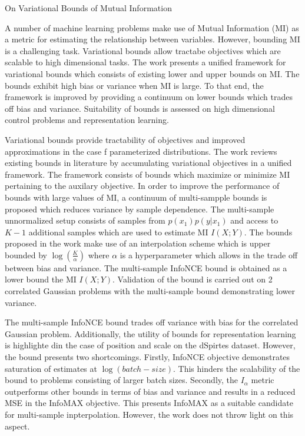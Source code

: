 \documentclass[11pt,letterpaper]{article}
\begin{document}
\begin{center}
  \large{On Variational Bounds of Mutual Information}
\end{center}



A number of machine learning problems make use of Mutual Information (MI) as a metric for estimating the relationship between variables. However, bounding MI is a challenging task. Variational bounds allow tractabe objectives which are scalable to high dimensional tasks. The work presents a unified framework for variational bounds which consists of existing lower and upper bounds on MI. The bounds exhibit high bias or variance when MI is large. To that end, the framework is improved by providing a continuum on lower bounds which trades off bias and variance. Suitability of bounds is assessed on high dimensional control problems and representation learning. 

Variational bounds provide tractability of objectives and improved approximations in the case f parameterized distributions. The work reviews existing bounds in literature by accumulating variational objectives in a unified framework. The framework consists of bounds which maximize or minimize MI pertaining to the auxilary objective. In order to improve the performance of bounds with large values of MI, a continuum of multi-sampple bounds is proposed which reduces variance by sample dependence. The multi-sample unnormalized setup consists of samples from $p(x_{1})p(y|x_{1})$ and access to $K-1$ additional samples which are used to estimate MI $I(X;Y)$. The bounds proposed in the work make use of an interpolation scheme which is upper bounded by $\log(\frac{K}{\alpha})$ where $\alpha$ is a hyperparameter which allows in the trade off between bias and variance. The multi-sample InfoNCE bound is obtained as a lower bound the MI $I(X;Y)$. Validation of the bound is carried out on 2 correlated Gaussian problems with the multi-sample bound demonstrating lower variance.

The multi-sample InfoNCE bound trades off variance with bias for the correlated Gaussian problem. Additionally, the utility of bounds for representation learning is highlighte din the case of position and scale on the dSpirtes dataset. However, the bound presents two shortcomings. Firstly, InfoNCE objective demonstrates saturation of estimates at $\log(batch-size)$. This hinders the scalability of the bound to problems consisting of larger batch sizes. Secondly, the $I_{\alpha}$ metric outperforms other bounds in terms of bias and variance and results in a reduced MSE in the InfoMAX objective. This presents InfoMAX as a suitable candidate for multi-sample inpterpolation. However, the work does not throw light on this aspect. 
\end{document}

